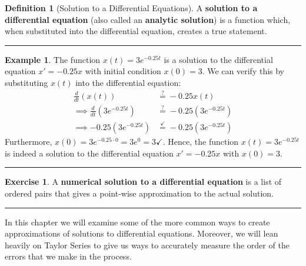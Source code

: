 \documentclass[
]{book}
\theoremstyle{definition}
\newtheorem{definition}{Definition}[chapter]
\theoremstyle{definition}
\newtheorem{example}{Example}[chapter]
\theoremstyle{definition}
\newtheorem{exercise}{Exercise}[chapter]
\theoremstyle{remark}
\begin{document}
\begin{definition}[Solution to a Differential Equations]
\protect\hypertarget{def:unnamed-chunk-411}{}{\label{def:unnamed-chunk-411} {} }A \textbf{solution to a differential equation} (also called an \textbf{analytic solution}) is a function which, when substituted into the differential equation, creates a true statement.
\end{definition}

\begin{center}\rule{0.5\linewidth}{0.5pt}\end{center}

\begin{example}
\protect\hypertarget{exm:unnamed-chunk-412}{}{\label{exm:unnamed-chunk-412} }The function \(x(t) = 3e^{-0.25t}\) is a solution to the differential equation \(x' = -0.25x\) with initial condition \(x(0) = 3\). We can verify this by substituting \(x(t)\) into the differential equation:
\[\begin{aligned} 
\frac{d}{dt} \left( x(t) \right) &\stackrel{?}{=} -0.25 x(t)\\
\implies \frac{d}{dt} \left( 3e^{-0.25t} \right) &\stackrel{?}{=} -0.25 \left( 3e^{-0.25t} \right) \\
\implies -0.25 \left( 3e^{-0.25t} \right) &\stackrel{\checkmark}{=} -0.25 \left( 3e^{-0.25t} \right)
\end{aligned}
\]
Furthermore, \(x(0) = 3e^{-0.25 \cdot 0} = 3e^0 = 3 \checkmark\). Hence, the function \(x(t) = 3e^{-0.25t}\) is indeed a solution to the differential equation \(x'=-0.25x\) with \(x(0) = 3\).
\end{example}

\begin{center}\rule{0.5\linewidth}{0.5pt}\end{center}

\begin{exercise}
\protect\hypertarget{exr:unnamed-chunk-413}{}{\label{exr:unnamed-chunk-413} }A \textbf{numerical solution to a differential equation} is a list of ordered
pairs that gives a point-wise approximation to the actual solution.
\end{exercise}

\begin{center}\rule{0.5\linewidth}{0.5pt}\end{center}

In this chapter we will examine some of the more common ways to create approximations of solutions to differential equations. Moreover, we will lean heavily on Taylor Series to give us ways to accurately measure the order of the errors that we make in the process.
\end{document}
